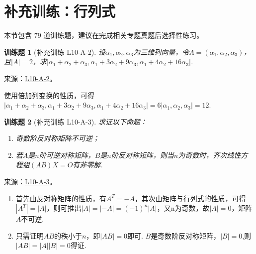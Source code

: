 \documentclass[UTF8,12pt,a4paper,fontset=fandol]{ctexart}
\newtheorem{exercise}{训练题}[section]
\begin{document}
\section{补充训练：行列式}

本节包含 79 道训练题，建议在完成相关专题真题后选择性练习。

\begin{exercise}[补充训练 L10-A-2]\label{prob:L10-A-2}
设$\alpha_1,\alpha_2,\alpha_3$为三维列向量，令$A=(\alpha_1,\alpha_2,\alpha_3)$，且$|A|=2$，求$|\alpha_1+\alpha_2+\alpha_3,\alpha_1+3\alpha_2+9\alpha_3,\alpha_1+4\alpha_2+16\alpha_3|$.
\end{exercise}
\noindent 来源：\href{https://github.com/yhwu-is/Linear-Algebra-Left-Undone/blob/new/%E8%AE%B2%E4%B9%89/%E4%B8%93%E9%A2%98/10%20%E8%A1%8C%E5%88%97%E5%BC%8F.tex}{L10-A-2}。
\begin{solve}
使用倍加列变换的性质，可得$|\alpha_1+\alpha_2+\alpha_3,\alpha_1+3\alpha_2+9\alpha_3,\alpha_1+4\alpha_2+16\alpha_3|=6|\alpha_1,\alpha_2,\alpha_3|=12$.
\end{solve}

\begin{exercise}[补充训练 L10-A-3]\label{prob:L10-A-3}
求证以下命题：
        \begin{enumerate}
            \item 奇数阶反对称矩阵不可逆；

            \item 若$A$是$n$阶可逆对称矩阵，$B$是$n$阶反对称矩阵，则当$n$为奇数时，齐次线性方程组$(AB)X=O$有非零解.
        \end{enumerate}
\end{exercise}
\noindent 来源：\href{https://github.com/yhwu-is/Linear-Algebra-Left-Undone/blob/new/%E8%AE%B2%E4%B9%89/%E4%B8%93%E9%A2%98/10%20%E8%A1%8C%E5%88%97%E5%BC%8F.tex}{L10-A-3}。
\begin{solve}
\begin{enumerate}
                \item 首先由反对称矩阵的性质，有$A^T=-A$，其次由矩阵与行列式的性质，可得$|A^T|=|A|$，则可推出$|A|=|-A|=(-1)^n|A|$，又n为奇数，故$|A|=0$，矩阵$A$不可逆.

                \item 只需证明$AB$的秩小于$n$，即$|AB|=0$即可. $B$是奇数阶反对称矩阵，$|B|=0$,则$|AB|=|A||B|=0$得证.
            \end{enumerate}
\end{solve}
\end{document}
